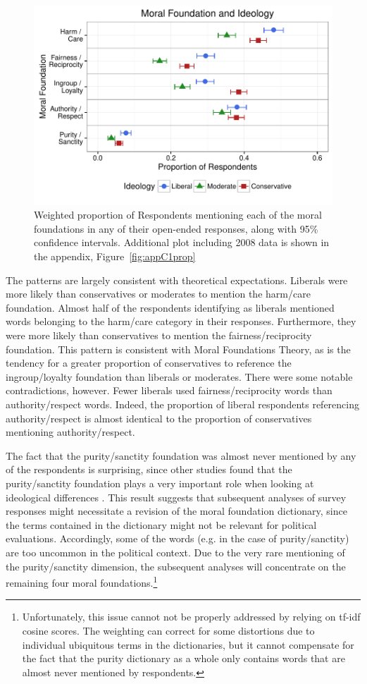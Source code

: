 \documentclass[12pt]{article}
\begin{document}
\begin{figure}[h]\centering
\includegraphics[scale=.9]{../calc/fig/fig1prop.pdf}
\caption{Weighted proportion of Respondents mentioning each of the moral foundations in any of their open-ended responses, along with 95\% confidence intervals. Additional plot including 2008 data is shown in the appendix, Figure~\ref{fig:appC1prop}}\label{fig:1prop}
\end{figure}

The patterns are largely consistent with theoretical expectations. Liberals were more likely than conservatives or moderates to mention the harm/care foundation. Almost half of the respondents identifying as liberals mentioned words belonging to the harm/care category in their responses. Furthermore, they were more likely than conservatives to mention the fairness/reciprocity foundation. This pattern is consistent with Moral Foundations Theory, as is the tendency for a greater proportion of conservatives to reference the ingroup/loyalty foundation than liberals or moderates. There were some notable contradictions, however. Fewer liberals used fairness/reciprocity words than authority/respect words. Indeed, the proportion of liberal respondents referencing authority/respect is almost identical to the proportion of conservatives mentioning authority/respect.

The fact that the purity/sanctity foundation was almost never mentioned by any of the respondents is surprising, since other studies found that the purity/sanctity foundation plays a very important role when looking at ideological differences \citep{koleva2012tracing}. This result suggests that subsequent analyses of survey responses might necessitate a revision of the moral foundation dictionary, since the terms contained in the dictionary might not be relevant for political evaluations. Accordingly, some of the words (e.g. in the case of purity/sanctity) are too uncommon in the political context. Due to the very rare mentioning of the purity/sanctity dimension, the subsequent analyses will concentrate on the remaining four moral foundations.\footnote{Unfortunately, this issue cannot not be properly addressed by relying on tf-idf cosine scores. The weighting can correct for some distortions due to individual ubiquitous terms in the dictionaries, but it cannot compensate for the fact that the purity dictionary as a whole only contains words that are almost never mentioned by respondents.}
\end{document}

